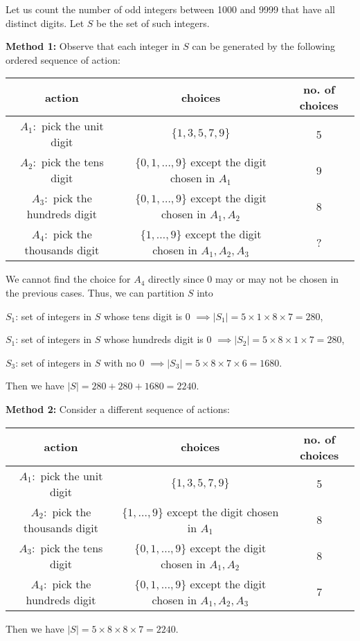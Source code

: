 \begin{eg}
    Let us count the number of odd integers between 1000 and 9999 that have all distinct digits. Let \(S\) be the set of such integers. 
    
    \textbf{Method 1:} Observe that each integer in \(S\) can be generated by the following ordered sequence of action:
    \begin{table}[H]
        \centering
        \begin{tabular}{c|c|c}
                action & choices & no. of choices  \\
            \midrule
                \(A_1:\) pick the unit digit & \(\{1, 3, 5, 7, 9\}\)  & 5  \\
                \(A_2:\) pick the tens digit & \(\{0, 1, \dots, 9\}\) except the digit chosen in \(A_1\) & 9  \\
                \(A_3:\) pick the hundreds digit & \(\{0, 1, \dots, 9\}\) except the digit chosen in \(A_1, A_2\) & 8  \\
                \(A_4:\) pick the thousands digit & \(\{1, \dots, 9\}\) except the digit chosen in \(A_1, A_2, A_3\) & ?  \\
        \end{tabular}
    \end{table}
    We cannot find the choice for \(A_4\) directly since 0 may or may not be chosen in the previous cases. Thus, we can partition \(S\) into

    \(S_1\): set of integers in \(S\) whose tens digit is 0 \(\implies \vert S_1 \vert = 5 \times 1 \times 8 \times 7 = 280\),

    \(S_1\): set of integers in \(S\) whose hundreds digit is 0 \(\implies \vert S_2 \vert = 5 \times 8 \times 1 \times 7 = 280\),

    \(S_3\): set of integers in \(S\) with no 0 \(\implies \vert S_3 \vert = 5 \times 8 \times 7 \times 6 = 1680\).

    Then we have \(\vert S \vert = 280 + 280 + 1680 = 2240\). 

    \textbf{Method 2:} Consider a different sequence of actions:
    \begin{table}[H]
        \centering
        \begin{tabular}{c|c|c}
                action & choices & no. of choices  \\
            \midrule
                \(A_1:\) pick the unit digit & \(\{1, 3, 5, 7, 9\}\)  & 5  \\
                \(A_2:\) pick the thousands digit & \(\{1, \dots, 9\}\) except the digit chosen in \(A_1\) & 8  \\
                \(A_3:\) pick the tens digit & \(\{0, 1, \dots, 9\}\) except the digit chosen in \(A_1, A_2\) & 8  \\
                \(A_4:\) pick the hundreds digit & \(\{0, 1, \dots, 9\}\) except the digit chosen in \(A_1, A_2, A_3\) & 7  \\
        \end{tabular}
    \end{table}
    Then we have \(\vert S \vert = 5 \times 8 \times 8 \times 7 = 2240\). 
\end{eg}

